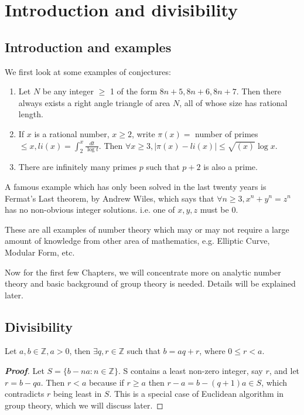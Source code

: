 \section{Introduction and divisibility}

\subsection{Introduction and examples}

We first look at some examples of conjectures:
\begin{enumerate}
\item Let $N$ be any integer $\ge$ 1 of the form $8n+5,8n+6,8n+7$. Then there always exists a right angle triangle of area $N$, all of whose size has rational length.
\item If $x$ is a rational number, $x \ge 2$, write $\pi(x)=$ number of primes $\le x, li(x)=\int_2^x \frac{dt}{\log{t}}$. Then $\forall x \ge 3, |\pi(x) - li(x)| \le \sqrt{(x)} \log{x}$.
\item There are infinitely many primes $p$ such that $p+2$ is also a prime.
\end{enumerate}
A famous example which has only been solved in the last twenty years is Fermat's Last theorem, by Andrew Wiles, which says that $\forall n \ge 3, x^n + y^n =z^n$ has no non-obvious integer solutions. i.e. one of $x, y, z$ must be $0$.

These are all examples of number theory which may or may not require a large amount of knowledge from other area of mathematics, e.g. Elliptic Curve, Modular Form, etc.

Now for the first few Chapters, we will concentrate more on analytic number theory and basic background of group theory is needed. Details will be explained later.

\subsection{Divisibility}

\begin{theorem} 
Let $a,b \in \mathbb{Z}, a>0$, then $\exists q,r \in \mathbb{Z}$ such that $b=aq+r$, where $0 \le r <a$.
\end{theorem}

\begin{proof}[\bf Proof] Let $S =\{b - na: n \in \mathbb{Z}\}$. S contains a least non-zero integer, say $r$, and let $r=b-qa$. Then $r < a$ because if $r \ge a$ then $r-a =b - (q+1)a \in S$, which contradicts $r$ being least in $S$. This is a special case of Euclidean algorithm in group theory, which we will discuss later.
\end{proof}

